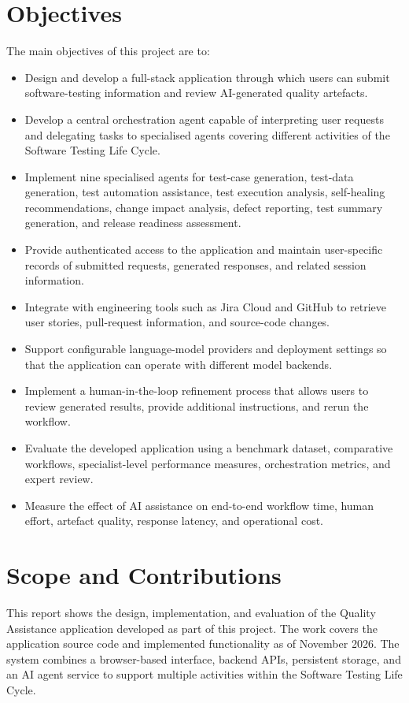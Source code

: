 \section{Objectives}
The main objectives of this project are to:
\begin{itemize}
  \item Design and develop a full-stack application through which users can submit software-testing information and review AI-generated quality artefacts.
  \item Develop a central orchestration agent capable of interpreting user requests and delegating tasks to specialised agents covering different activities of the Software Testing Life Cycle.
  \item Implement nine specialised agents for test-case generation, test-data generation, test automation assistance, test execution analysis, self-healing recommendations, change impact analysis, defect reporting, test summary generation, and release readiness assessment.
  \item Provide authenticated access to the application and maintain user-specific records of submitted requests, generated responses, and related session information.
  \item Integrate with engineering tools such as Jira Cloud and GitHub to retrieve user stories, pull-request information, and source-code changes.
  \item Support configurable language-model providers and deployment settings so that the application can operate with different model backends.
  \item Implement a human-in-the-loop refinement process that allows users to review generated results, provide additional instructions, and rerun the workflow.
  \item Evaluate the developed application using a benchmark dataset, comparative workflows, specialist-level performance measures, orchestration metrics, and expert review.
  \item Measure the effect of AI assistance on end-to-end workflow time, human effort, artefact quality, response latency, and operational cost.
\end{itemize}

\section{Scope and Contributions}
This report shows the design, implementation, and evaluation of the Quality Assistance application developed as part of this project. The work covers the application source code and implemented functionality \cite{qaapprepo} as of November 2026. The system combines a browser-based interface, backend APIs, persistent storage, and an AI agent service to support multiple activities within the Software Testing Life Cycle.

